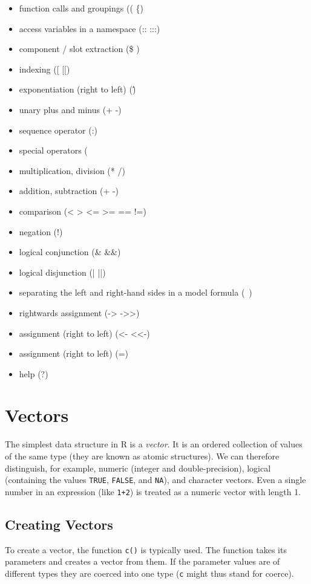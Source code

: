 \begin{itemize}
    \item function calls and groupings (( \{)
    \item access variables in a namespace (:: :::)
    \item component / slot extraction (\$ \@)
    \item indexing ([ [[)
    \item exponentiation (right to left) (\^)
    \item unary plus and minus (+ -)
    \item sequence operator (:)
    \item special operators (%
    \item multiplication, division (* /)
    \item addition, subtraction (+ -)
    \item comparison (< > <= >= == !=)
    \item negation (!)
    \item logical conjunction (\& \&\&)
    \item logical disjunction (| ||)
    \item  separating the left and right-hand sides in a model formula (~)
    \item rightwards assignment (-> ->>)
    \item assignment (right to left) (<- <<-)
    \item assignment (right to left) (=)
    \item help (?)
\end{itemize}

\section{Vectors}
The simplest data structure in R is a \textit{vector}. It is an ordered collection of values
of the same type (they are known as atomic structures). We can therefore distinguish, for example, numeric (integer and double-precision), logical (containing
the values \texttt{TRUE}, \texttt{FALSE}, and \texttt{NA}), and character vectors. Even a single number in
an expression (like \texttt{1+2}) is treated as a numeric vector with length 1.

\subsection{Creating Vectors}
To create a vector, the function \texttt{c()} is typically used. The function takes its parameters and creates a vector from them. If the parameter values are of different
types they are coerced into one type (\texttt{c} might thus stand for coerce).

